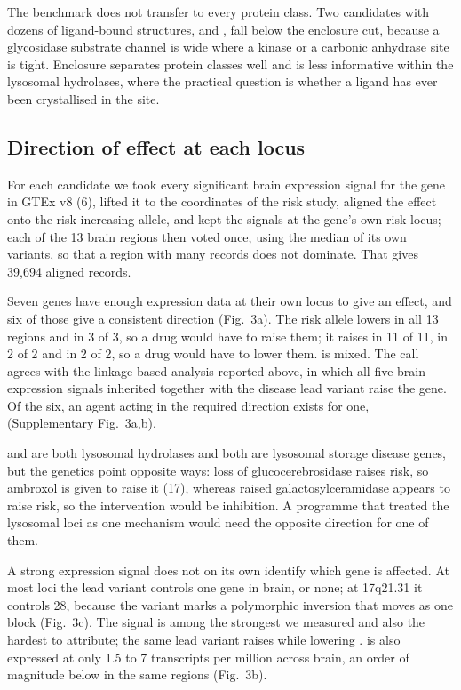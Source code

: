 \documentclass[10pt]{article}
\begin{document}
The benchmark does not transfer to every protein class. Two candidates with dozens of ligand-bound structures, 
and , fall below the enclosure cut, because a glycosidase substrate channel is wide
where a kinase or a carbonic anhydrase site is tight. Enclosure separates protein classes well and is less informative within the lysosomal hydrolases, where the practical question is whether a ligand has ever been crystallised in the site.

\subsection*{Direction of effect at each locus}

For each candidate we took every significant brain expression signal for the gene in GTEx v8 (6), lifted it to the coordinates of the risk study, aligned the
effect onto the risk-increasing allele, and kept the signals at the gene's own risk locus; each of
the 13 brain regions then voted once, using the median of its own variants, so that a region with many records does not dominate. That gives 39,694 aligned
records.

Seven genes have enough expression data at their own locus to give an effect, and six of those give a consistent direction (Fig.~3a). The risk allele lowers  in all 13 regions and
 in 3 of 3, so a drug would have to raise them; it raises  in 11 of 11,
 in 2 of 2 and  in 2 of 2, so a drug would have to lower them.  is
mixed. The  call agrees with the linkage-based analysis reported above, in which all five brain expression signals inherited together with the disease lead variant raise the gene. Of the six, an agent acting in the required direction exists for one, 
(Supplementary Fig.~3a,b).

 and  are both lysosomal
hydrolases and both are lysosomal storage disease genes, but the genetics point opposite ways:
loss of glucocerebrosidase raises risk, so ambroxol is given to raise it (17), whereas raised
galactosylceramidase appears to raise risk, so the intervention would be inhibition. A programme that treated the lysosomal loci as one mechanism would need the opposite direction for one of them.

A strong expression signal does not on its own identify which gene is affected. At most
loci the lead variant controls one gene in brain, or none; at 17q21.31 it
controls 28, because the variant marks a polymorphic inversion that moves as one
block (Fig.~3c). The  signal is among the strongest we measured and also the hardest to attribute; the same lead variant raises  while lowering .  is also expressed at only 1.5 to 7 transcripts per million across brain, an order of magnitude below  in the same regions (Fig.~3b).
\end{document}

